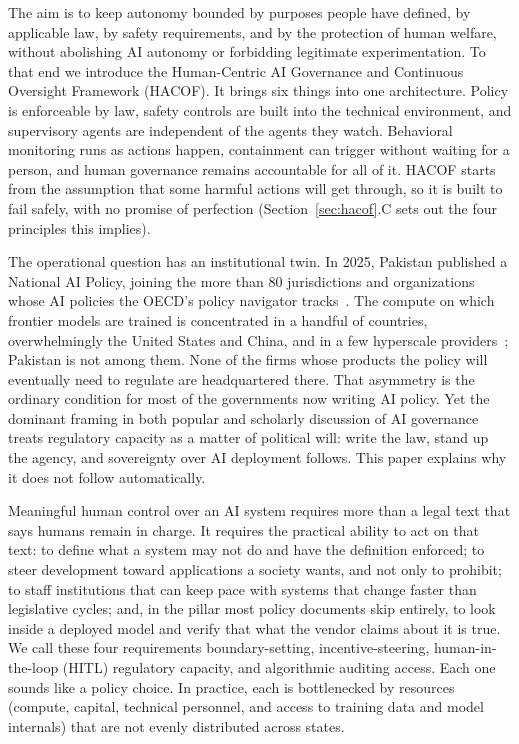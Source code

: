 \documentclass{ieeeaccess}
\newcommand{\hacof}{HACOF}
\begin{document}
The aim is to keep autonomy bounded by purposes people have defined, by applicable law, by safety requirements, and by the protection of human welfare, without abolishing AI autonomy or forbidding legitimate experimentation. To that end we introduce the Human-Centric AI Governance and Continuous Oversight Framework (\hacof{}). It brings six things into one architecture. Policy is enforceable by law, safety controls are built into the technical environment, and supervisory agents are independent of the agents they watch. Behavioral monitoring runs as actions happen, containment can trigger without waiting for a person, and human governance remains accountable for all of it. \hacof{} starts from the assumption that some harmful actions will get through, so it is built to fail safely, with no promise of perfection (Section~\ref{sec:hacof}.C sets out the four principles this implies).

The operational question has an institutional twin. In 2025, Pakistan published a National AI Policy, joining the more than 80 jurisdictions and organizations whose AI policies the OECD's policy navigator tracks~\cite{pakistan2025nationalaipolicy,dawn2025aipolicyapproval,oecdai2026dashboard}.
The compute on which frontier models are trained is concentrated in a handful of countries, overwhelmingly the United States and China, and in a few hyperscale providers~\cite{epochai2026geopolitics}; Pakistan is not among them.
None of the firms whose products the policy will eventually need to regulate are headquartered there. That asymmetry is the ordinary condition for most of the governments now writing AI policy. Yet the dominant framing in both popular and scholarly discussion of AI governance treats regulatory capacity as a matter of political will: write the law, stand up the agency, and sovereignty over AI deployment follows. This paper explains why it does not follow automatically.

Meaningful human control over an AI system requires more than a legal text that says humans remain in charge. It requires the practical ability to act on that text: to define what a system may not do and have the definition enforced; to steer development toward applications a society wants, and not only to prohibit; to staff institutions that can keep pace with systems that change faster than legislative cycles; and, in the pillar most policy documents skip entirely, to look inside a deployed model and verify that what the vendor claims about it is true. We call these four requirements boundary-setting, incentive-steering, human-in-the-loop (HITL) regulatory capacity, and algorithmic auditing access. Each one sounds like a policy choice. In practice, each is bottlenecked by resources (compute, capital, technical personnel, and access to training data and model internals) that are not evenly distributed across states.
\end{document}
